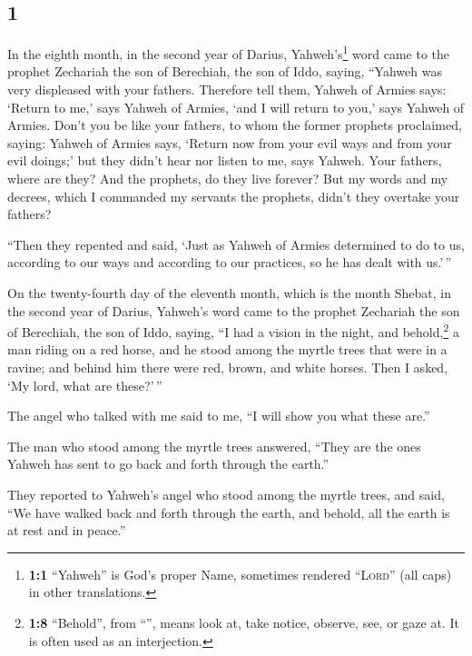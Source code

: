 \begin{paracol}{2}
\switchcolumn
\begin{otherlanguage}{english}

\hypertarget{section-1}{%
\section{1}\label{section-1}}

 In the eighth month, in the second year of Darius,
Yahweh's\footnote{\textbf{1:1} ``Yahweh'' is God's proper Name,
  sometimes rendered ``\textsc{Lord}'' (all caps) in other translations.}
word came to the prophet Zechariah the son of Berechiah, the son of
Iddo, saying,  ``Yahweh was very displeased with your
fathers.  Therefore tell them, Yahweh of Armies says:
`Return to me,' says Yahweh of Armies, `and I will return to you,' says
Yahweh of Armies.  Don't you be like your fathers, to whom
the former prophets proclaimed, saying: Yahweh of Armies says, `Return
now from your evil ways and from your evil doings;' but they didn't hear
nor listen to me, says Yahweh.  Your fathers, where are
they? And the prophets, do they live forever?  But my
words and my decrees, which I commanded my servants the prophets, didn't
they overtake your fathers?

``Then they repented and said, `Just as Yahweh of Armies determined to
do to us, according to our ways and according to our practices, so he
has dealt with us.'\,''

 On the twenty-fourth day of the eleventh month, which is
the month Shebat, in the second year of Darius, Yahweh's word came to
the prophet Zechariah the son of Berechiah, the son of Iddo, saying,
 ``I had a vision in the night, and behold,\footnote{\textbf{1:8}
  ``Behold'', from ``'', means look at, take notice,
  observe, see, or gaze at. It is often used as an interjection.} a man
riding on a red horse, and he stood among the myrtle trees that were in
a ravine; and behind him there were red, brown, and white horses.
 Then I asked, `My lord, what are these?'\,''

The angel who talked with me said to me, ``I will show you what these
are.''

 The man who stood among the myrtle trees answered,
``They are the ones Yahweh has sent to go back and forth through the
earth.''

 They reported to Yahweh's angel who stood among the
myrtle trees, and said, ``We have walked back and forth through the
earth, and behold, all the earth is at rest and in peace.''


\end{otherlanguage}
\end{paracol}
